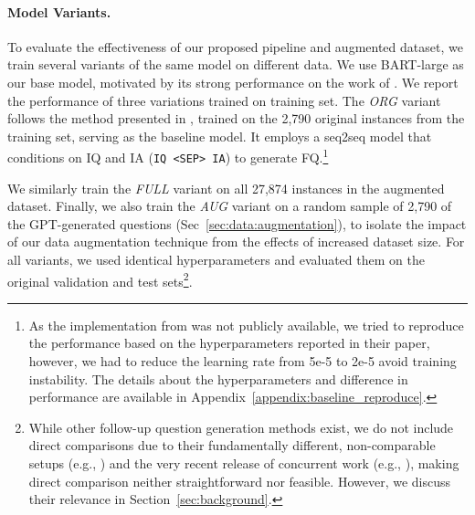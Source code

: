 \paragraph{Model Variants.} To evaluate the effectiveness of our proposed pipeline and augmented dataset, we train several variants of the same model on different data. We use BART-large \cite{lewis-etal-2020-bart} as our base model, motivated by its strong performance on the work of \fd{} \cite{meng-etal-2023-followupqg}. We report the performance of three variations trained on \fd{} training set. The \textit{ORG} variant follows the method presented in \citet{meng-etal-2023-followupqg}, trained on the 2,790 original instances from the training set, serving as the baseline model. It employs a seq2seq model that conditions on IQ and IA (\texttt{IQ <SEP> IA}) to generate FQ.\footnote{As the implementation from  was not publicly available, we tried to reproduce the performance based on the hyperparameters reported in their paper, however, we had to reduce the learning rate from 5e-5 to 2e-5 avoid training instability. The details about the hyperparameters and difference in performance are available in Appendix~\ref{appendix:baseline_reproduce}.} 

We similarly train the \textit{FULL} variant on all 27,874 instances in the augmented dataset. Finally, we also train the \textit{AUG} variant on a random sample of 2,790 of the GPT-generated questions (Sec~\ref{sec:data:augmentation}), to isolate the impact of our data augmentation technique from the effects of increased dataset size. For all variants, we used identical hyperparameters and evaluated them on the original \fd{} validation and test sets\footnote{While other follow-up question generation methods exist, we do not include direct comparisons due to their fundamentally different, non-comparable setups (e.g., \citet{mazzaccara-etal-2024-learning}) and the very recent release of concurrent work (e.g., \citet{liu-etal-2025-superficial}), making direct comparison neither straightforward nor feasible. However, we discuss their relevance in Section~\ref{sec:background}.}. %




